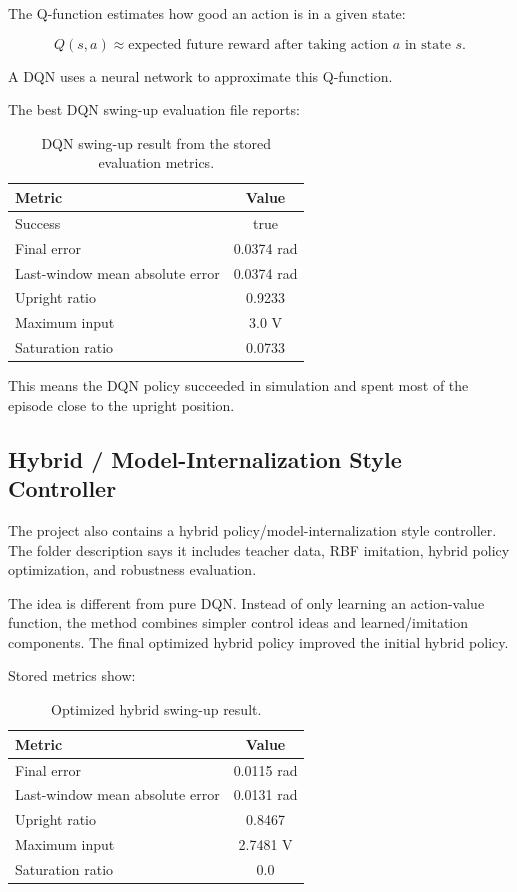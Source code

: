 \documentclass[11pt,a4paper]{article}
\begin{document}
The Q-function estimates how good an action is in a given state:

\begin{equation}
Q(s,a) \approx \text{expected future reward after taking action } a \text{ in state } s.
\end{equation}

A DQN uses a neural network to approximate this Q-function.

The best DQN swing-up evaluation file reports:

\begin{table}[h]
\centering
\caption{DQN swing-up result from the stored evaluation metrics.}
\begin{tabular}{lc}
\toprule
Metric & Value \\
\midrule
Success & true \\
Final error & 0.0374 rad \\
Last-window mean absolute error & 0.0374 rad \\
Upright ratio & 0.9233 \\
Maximum input & 3.0 V \\
Saturation ratio & 0.0733 \\
\bottomrule
\end{tabular}
\end{table}

This means the DQN policy succeeded in simulation and spent most of the episode close to the upright position.

\subsection{Hybrid / Model-Internalization Style Controller}

The project also contains a hybrid policy/model-internalization style controller.
The folder description says it includes teacher data, RBF imitation, hybrid policy optimization, and robustness evaluation.

The idea is different from pure DQN.
Instead of only learning an action-value function, the method combines simpler control ideas and learned/imitation components.
The final optimized hybrid policy improved the initial hybrid policy.

Stored metrics show:

\begin{table}[h]
\centering
\caption{Optimized hybrid swing-up result.}
\begin{tabular}{lc}
\toprule
Metric & Value \\
\midrule
Final error & 0.0115 rad \\
Last-window mean absolute error & 0.0131 rad \\
Upright ratio & 0.8467 \\
Maximum input & 2.7481 V \\
Saturation ratio & 0.0 \\
\bottomrule
\end{tabular}
\end{table}
\end{document}
